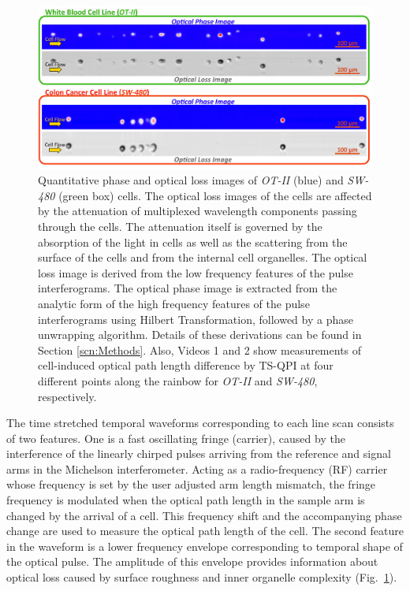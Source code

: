 \documentclass[aps,pra,reprint,superscriptaddress]{revtex4-1}
\begin{document}
\begin{figure}
\includegraphics[scale=0.2]{Figure2DImage.jpg}
\caption{\label{fig:2DImage} Quantitative phase and optical loss images of \textit{OT-II} (blue) and \textit{SW-480} (green box) cells. The optical loss images of the cells are affected by the attenuation of multiplexed wavelength components passing through the cells. The attenuation itself is governed by the absorption of the light in cells as well as the scattering from the surface of the cells and from the internal cell organelles. The optical loss image is derived from the low frequency features of the pulse interferograms. The optical phase image is extracted from the analytic form of the high frequency features of the pulse interferograms using Hilbert Transformation, followed by a phase unwrapping algorithm. Details of these derivations can be found in Section \ref{scn:Methods}. Also, Videos 1 and 2 show measurements of cell-induced optical path length difference by TS-QPI at four different points along the rainbow for \textit{OT-II} and \textit{SW-480}, respectively.}
\end{figure}

The time stretched temporal waveforms corresponding to each line scan consists of two features. One is a fast oscillating fringe (carrier), caused by the interference of the linearly chirped pulses arriving from the reference and signal arms in the Michelson interferometer. Acting as a radio-frequency (RF) carrier whose frequency is set by the user adjusted arm length mismatch, the fringe frequency is modulated when the optical path length in the sample arm is changed by the arrival of a cell. This frequency shift and the accompanying phase change are used to measure the optical path length of the cell. The second feature in the waveform is a lower frequency envelope corresponding to temporal shape of the optical pulse. The amplitude of this envelope provides information about optical loss caused by surface roughness and inner organelle complexity (Fig.~\ref{fig:2DImage}). 
\end{document}
